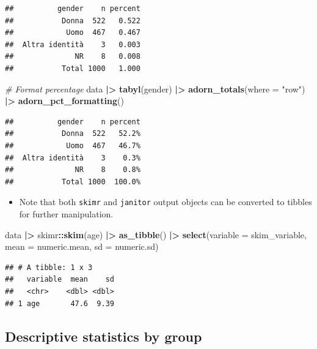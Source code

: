 \documentclass[
]{book}
\newenvironment{Shaded}{\begin{snugshade}}{\end{snugshade}}
\newcommand{\AttributeTok}[1]{\textcolor[rgb]{0.13,0.29,0.53}{#1}}
\newcommand{\CommentTok}[1]{\textcolor[rgb]{0.56,0.35,0.01}{\textit{#1}}}
\newcommand{\FunctionTok}[1]{\textcolor[rgb]{0.13,0.29,0.53}{\textbf{#1}}}
\newcommand{\NormalTok}[1]{#1}
\newcommand{\SpecialCharTok}[1]{\textcolor[rgb]{0.81,0.36,0.00}{\textbf{#1}}}
\newcommand{\StringTok}[1]{\textcolor[rgb]{0.31,0.60,0.02}{#1}}
\providecommand{\tightlist}{%
  \setlength{\itemsep}{0pt}\setlength{\parskip}{0pt}}
\begin{document}
\begin{verbatim}
##          gender    n percent
##           Donna  522   0.522
##            Uomo  467   0.467
##  Altra identità    3   0.003
##              NR    8   0.008
##           Total 1000   1.000
\end{verbatim}

\begin{Shaded}
\begin{Highlighting}[]
\CommentTok{\# Format percentage}
\NormalTok{data }\SpecialCharTok{|\textgreater{}} 
  \FunctionTok{tabyl}\NormalTok{(gender) }\SpecialCharTok{|\textgreater{}} 
  \FunctionTok{adorn\_totals}\NormalTok{(}\AttributeTok{where =} \StringTok{"row"}\NormalTok{) }\SpecialCharTok{|\textgreater{}} 
  \FunctionTok{adorn\_pct\_formatting}\NormalTok{()}
\end{Highlighting}
\end{Shaded}

\begin{verbatim}
##          gender    n percent
##           Donna  522   52.2%
##            Uomo  467   46.7%
##  Altra identità    3    0.3%
##              NR    8    0.8%
##           Total 1000  100.0%
\end{verbatim}

\begin{itemize}
\tightlist
\item
  Note that both \texttt{skimr} and \texttt{janitor} output objects can be converted to tibbles for further manipulation.
\end{itemize}

\begin{Shaded}
\begin{Highlighting}[]
\NormalTok{data }\SpecialCharTok{|\textgreater{}} 
\NormalTok{  skimr}\SpecialCharTok{::}\FunctionTok{skim}\NormalTok{(age) }\SpecialCharTok{|\textgreater{}} 
  \FunctionTok{as\_tibble}\NormalTok{() }\SpecialCharTok{|\textgreater{}} 
  \FunctionTok{select}\NormalTok{(}\AttributeTok{variable =}\NormalTok{ skim\_variable, }\AttributeTok{mean =}\NormalTok{ numeric.mean, }\AttributeTok{sd =}\NormalTok{ numeric.sd)}
\end{Highlighting}
\end{Shaded}

\begin{verbatim}
## # A tibble: 1 x 3
##   variable  mean    sd
##   <chr>    <dbl> <dbl>
## 1 age       47.6  9.39
\end{verbatim}

\hypertarget{descriptive-statistics-by-group}{%
\subsection{Descriptive statistics by group}\label{descriptive-statistics-by-group}}
\end{document}
